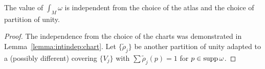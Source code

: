 \begin{lemma}
  The value of $\int_M\omega$ is independent from the choice of the atlas and the choice of partition of unity.
\end{lemma}
\begin{proof}
  The independence from the choice of the charts was demonstrated in Lemma~\ref{lemma:intindep:chart}.
  Let $\{\widetilde\rho_j\}$ be another partition of unity adapted to a (possibly different) covering $\{V_j\}$ with $\sum \widetilde\rho_j(p) = 1$ for $p\in\operatorname{supp}\omega$.
  \TODO
\end{proof}